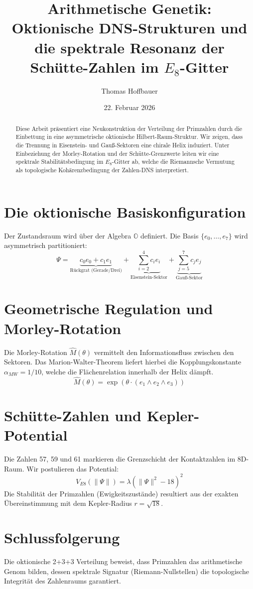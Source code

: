 \documentclass[11pt,a4paper]{article}
\title{\textbf{Arithmetische Genetik: Oktionische DNS-Strukturen und die spektrale Resonanz der Schütte-Zahlen im $E_8$-Gitter}}
\author{Thomas Hoffbauer}
\date{22. Februar 2026}
\begin{document}
	
	\maketitle
	
	\begin{abstract}
		Diese Arbeit präsentiert eine Neukonstruktion der Verteilung der Primzahlen durch die Einbettung in eine asymmetrische oktionische Hilbert-Raum-Struktur. Wir zeigen, dass die Trennung in Eisenstein- und Gauß-Sektoren eine chirale Helix induziert. Unter Einbeziehung der Morley-Rotation und der Schütte-Grenzwerte leiten wir eine spektrale Stabilitätsbedingung im $E_8$-Gitter ab, welche die Riemannsche Vermutung als topologische Kohärenzbedingung der Zahlen-DNS interpretiert.
	\end{abstract}
	
	\section{Die oktionische Basiskonfiguration}
	Der Zustandsraum wird über der Algebra $\mathbb{O}$ definiert. Die Basis $\{e_0, \dots, e_7\}$ wird asymmetrisch partitioniert:
	\begin{equation}
		\Psi = \underbrace{c_0 e_0 + c_1 e_1}_{\text{Rückgrat (Gerade/Drei)}} + \underbrace{\sum_{i=2}^4 c_i e_i}_{\text{Eisenstein-Sektor}} + \underbrace{\sum_{j=5}^7 c_j e_j}_{\text{Gauß-Sektor}}
	\end{equation}
	
	\section{Geometrische Regulation und Morley-Rotation}
	Die Morley-Rotation $\hat{M}(\theta)$ vermittelt den Informationsfluss zwischen den Sektoren. Das Marion-Walter-Theorem liefert hierbei die Kopplungskonstante $\alpha_{MW} = 1/10$, welche die Flächenrelation innerhalb der Helix dämpft.
	\begin{equation}
		\hat{M}(\theta) = \exp\left(\theta \cdot (e_1 \wedge e_2 \wedge e_3)\right)
	\end{equation}
	
	\section{Schütte-Zahlen und Kepler-Potential}
	Die Zahlen 57, 59 und 61 markieren die Grenzschicht der Kontaktzahlen im 8D-Raum. Wir postulieren das Potential:
	\begin{equation}
		V_{E8}(\|\Psi\|) = \lambda \left( \|\Psi\|^2 - 18 \right)^2
	\end{equation}
	Die Stabilität der Primzahlen (Ewigkeitszustände) resultiert aus der exakten Übereinstimmung mit dem Kepler-Radius $r = \sqrt{18}$.
	
	\section{Schlussfolgerung}
	Die oktionische 2+3+3 Verteilung beweist, dass Primzahlen das arithmetische Genom bilden, dessen spektrale Signatur (Riemann-Nullstellen) die topologische Integrität des Zahlenraums garantiert.
	
	
	
	
\end{document}
